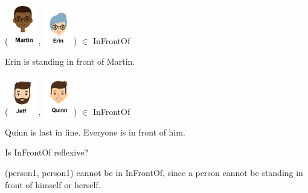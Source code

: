 \documentclass{ximera}
\begin{document}
\begin{exercise}


 ({\includegraphics[width=50px,height=65px]{pics/people/martin.png}}, {\includegraphics[width=50px,height=65px]{pics/people/erin.png}}) $\in$ InFrontOf 

  \begin{multipleChoice}
  \end{multipleChoice}
  \begin{feedback}
Erin is standing in front of Martin.
  \end{feedback}
\end{exercise}




\begin{exercise}



 ({\includegraphics[width=50px,height=65px]{pics/people/jeff.png}}, {\includegraphics[width=50px,height=65px]{pics/people/quinn.png}}) $\in$ InFrontOf 

  \begin{multipleChoice}
  \end{multipleChoice}
  \begin{feedback}
Quinn is last in line. Everyone is in front of him.
  \end{feedback}
\end{exercise}



\begin{exercise}
Is InFrontOf reflexive?

  \begin{multipleChoice}
  \end{multipleChoice}
  \begin{feedback}
  (person1, person1) cannot be in InFrontOf, since a person cannot be standing in front of himself or herself.
  \end{feedback}
\end{exercise}
\end{document}
